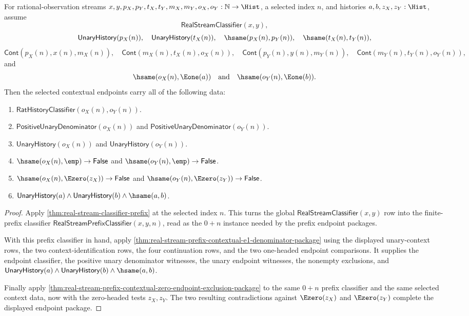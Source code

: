 \begin{theorem}
\label{thm:real-stream-classifier-selected-contextual-full-endpoint-package}
For rational-observation streams
$x,y,p_X,p_Y,t_X,t_Y,m_X,m_Y,o_X,o_Y:\mathbb{N}\to\Hist$, a selected index
$n$, and histories $a,b,z_X,z_Y:\Hist$, assume
$$
\mathsf{RealStreamClassifier}(x,y),
$$
$$
\mathsf{UnaryHistory}(p_X(n)),\quad
\mathsf{UnaryHistory}(t_X(n)),\quad
\hsame(p_X(n),p_Y(n)),\quad
\hsame(t_X(n),t_Y(n)),
$$
$$
\mathsf{Cont}(p_X(n),x(n),m_X(n)),\quad
\mathsf{Cont}(m_X(n),t_X(n),o_X(n)),
\quad
\mathsf{Cont}(p_Y(n),y(n),m_Y(n)),\quad
\mathsf{Cont}(m_Y(n),t_Y(n),o_Y(n)),
$$
and
$$
\hsame(o_X(n),\Eone(a))\quad\text{and}\quad \hsame(o_Y(n),\Eone(b)).
$$
Then the selected contextual endpoints carry all of the following data:
\begin{enumerate}
\item $\mathsf{RatHistoryClassifier}(o_X(n),o_Y(n))$.
\item $\mathsf{PositiveUnaryDenominator}(o_X(n))$ and
$\mathsf{PositiveUnaryDenominator}(o_Y(n))$.
\item $\mathsf{UnaryHistory}(o_X(n))$ and $\mathsf{UnaryHistory}(o_Y(n))$.
\item $\hsame(o_X(n),\emp)\to\mathsf{False}$ and
$\hsame(o_Y(n),\emp)\to\mathsf{False}$.
\item $\hsame(o_X(n),\Ezero(z_X))\to\mathsf{False}$ and
$\hsame(o_Y(n),\Ezero(z_Y))\to\mathsf{False}$.
\item $\mathsf{UnaryHistory}(a)\land\mathsf{UnaryHistory}(b)\land\hsame(a,b)$.
\end{enumerate}
\end{theorem}
\begin{proof}
Apply \autoref{thm:real-stream-classifier-prefix} at the selected index $n$.
This turns the global $\mathsf{RealStreamClassifier}(x,y)$ row into the
finite-prefix classifier $\mathsf{RealStreamPrefixClassifier}(x,y,n)$, read as
the $0+n$ instance needed by the prefix endpoint packages.

With this prefix classifier in hand, apply
\autoref{thm:real-stream-prefix-contextual-e1-denominator-package} using the
displayed unary-context rows, the two context-identification rows, the four
continuation rows, and the two one-headed endpoint comparisons. It supplies the
endpoint classifier, the positive unary denominator witnesses, the unary
endpoint witnesses, the nonempty exclusions, and
$\mathsf{UnaryHistory}(a)\land\mathsf{UnaryHistory}(b)\land\hsame(a,b)$.

Finally apply
\autoref{thm:real-stream-prefix-contextual-zero-endpoint-exclusion-package} to
the same $0+n$ prefix classifier and the same selected context data, now with
the zero-headed tests $z_X,z_Y$. The two resulting contradictions against
$\Ezero(z_X)$ and $\Ezero(z_Y)$ complete the displayed endpoint package.
\end{proof}

